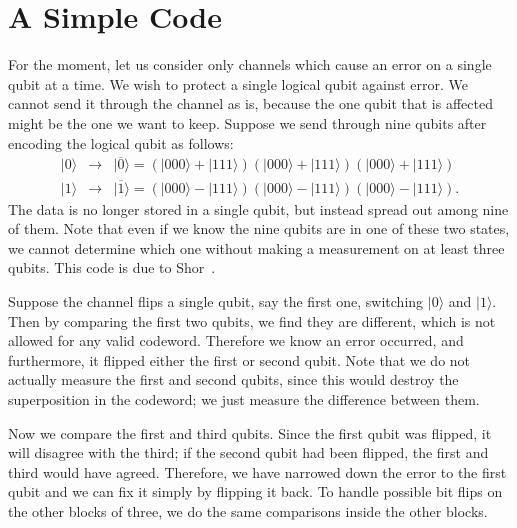 \documentclass{report}
\newcommand{\ket}[1]{|{#1}\rangle}
\begin{document}
\section{A Simple Code}

For the moment, let us consider only channels which cause an error on a 
single qubit at a time.  We wish to protect a single logical qubit against 
error.  We cannot send it through the channel as is, because the one qubit 
that is affected might be the one we want to keep.  Suppose we send through 
nine qubits after encoding the logical qubit as follows:
\begin{eqnarray}
\ket{0} & \rightarrow & \ket{\overline{0}} = (\ket{000} + \ket{111}) 
(\ket{000} + \ket{111}) (\ket{000} + \ket{111}) \\
\ket{1} & \rightarrow & \ket{\overline{1}} = (\ket{000} - \ket{111}) 
(\ket{000} - \ket{111}) (\ket{000} - \ket{111}).
\end{eqnarray}
The data is no longer stored in a single qubit, but instead spread out 
among nine of them.  Note that even if we know the nine qubits are in one 
of these two states, we cannot determine which one without making a 
measurement on at least three qubits.  This code is due to 
Shor~\cite{shor-9qubit}.

Suppose the channel flips a single qubit, say the first one, switching 
$\ket{0}$ and $\ket{1}$.  Then by comparing the first two qubits, we find 
they are different, which is not allowed for any valid codeword.  Therefore 
we know an error occurred, and furthermore, it flipped either the first or 
second qubit.  Note that we do not actually measure the first and second 
qubits, since this would destroy the superposition in the codeword; we just 
measure the difference between them.

Now we compare the first and third qubits.  Since the first qubit was 
flipped, it will disagree with the third; if the second qubit had been 
flipped, the first and third would have agreed.  Therefore, we have 
narrowed down the error to the first qubit and we can fix it simply by 
flipping it back.  To handle possible bit flips on the other blocks of three, 
we do the same comparisons inside the other blocks.
\end{document}
